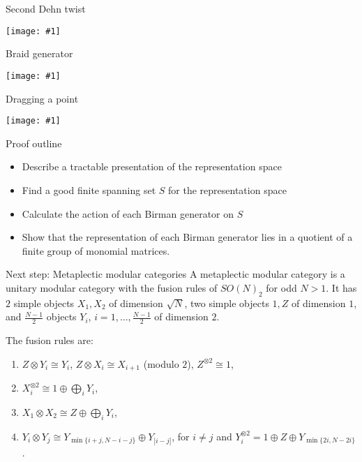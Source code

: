\documentclass{beamer}
\newcommand{\img}[1]{
\vfill
\centering
\texttt{[image: \#1]}
\vfill
}
\begin{document}
\begin{frame}{Second Dehn twist}
\img{t2}
\end{frame}

\begin{frame}{Braid generator}
\img{t3}
\end{frame}

\begin{frame}{Dragging a point}
\img{t4}
\end{frame}

\newcommand{\one}{1}


\begin{frame}{Proof outline}
\begin{itemize}
  \item Describe a tractable presentation of  the representation space
  \item Find a good finite spanning set $S$ for the representation space
  \item Calculate the action of each Birman generator on $S$
  \item Show that the representation of each Birman generator lies in a quotient of a finite group of monomial matrices.  
\end{itemize}
\end{frame}



\begin{frame}{Next step: Metaplectic modular categories}
  A metaplectic modular category is a unitary modular category with the fusion rules of  $SO(N)_2$ for odd $N>1$. It has $2$ simple objects $X_1, X_2$ of dimension $\sqrt{N}$, two simple objects $\one, Z$ of dimension $1$, and $\frac{N-1}{2}$ objects $Y_i$, $i=1,\ldots,\frac{N-1}{2}$ of dimension $2$.

  The fusion rules are:
\begin{enumerate}
 \item $Z\otimes Y_i\cong Y_i$, $Z\otimes X_i\cong X_{i+1}$ (modulo $2$), $Z^{\otimes 2}\cong\one$,
 \item $X_i^{\otimes 2}\cong \one\oplus \bigoplus_{i} Y_i$,
 \item $X_1\otimes X_2\cong Z\oplus\bigoplus_{i} Y_i$,
 \item $Y_i\otimes Y_j\cong Y_{\min\{i+j,N-i-j\}}\oplus Y_{|i-j|}$, for $i\neq j$ and $Y_i^{\otimes 2}=\one\oplus Z\oplus Y_{\min\{2i,N-2i\}}$.
\end{enumerate}

\end{frame}
\end{document}
